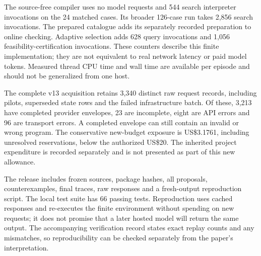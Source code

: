 The source-free compiler uses no model requests and 544 search interpreter invocations on the 24 matched cases. Its broader 126-case run takes 2,856 search invocations. The prepared catalogue adds its separately recorded preparation to online checking. Adaptive selection adds 628 query invocations and 1,056 feasibility-certification invocations. These counters describe this finite implementation; they are not equivalent to real network latency or paid model tokens. Measured thread CPU time and wall time are available per episode and should not be generalized from one host.

The complete v13 acquisition retains 3,340 distinct raw request records, including pilots, superseded state rows and the failed infrastructure batch. Of these, 3,213 have completed provider envelopes, 23 are incomplete, eight are API errors and 96 are transport errors. A completed envelope can still contain an invalid or wrong program. The conservative new-budget exposure is US\$3.1761, including unresolved reservations, below the authorized US\$20. The inherited project expenditure is recorded separately and is not presented as part of this new allowance.

The release includes frozen sources, package hashes, all proposals, counterexamples, final traces, raw responses and a fresh-output reproduction script. The local test suite has 66 passing tests. Reproduction uses cached responses and re-executes the finite environment without spending on new requests; it does not promise that a later hosted model will return the same output. The accompanying verification record states exact replay counts and any mismatches, so reproducibility can be checked separately from the paper's interpretation.


